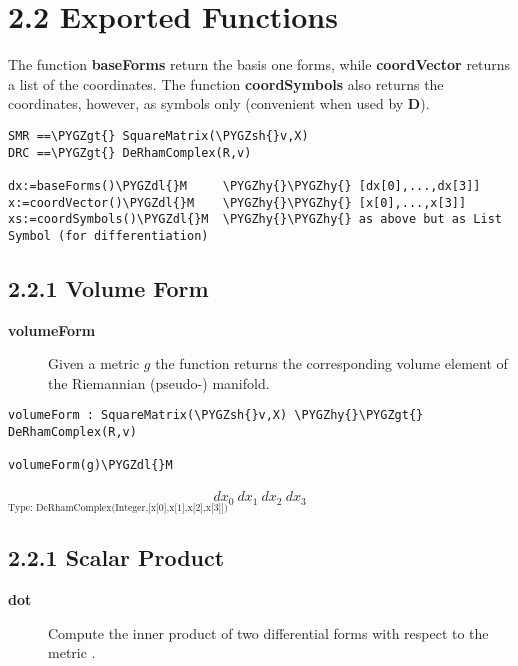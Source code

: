 \documentclass[letterpaper,10pt,english]{sphinxmanual}
\def\PYGZgt{\char`\>}
\def\PYGZsh{\char`\#}
\def\PYGZdl{\char`\$}
\def\PYGZhy{\char`\-}
\begin{document}
\section{2.2 Exported Functions}
\label{section-2.0:exported-functions}
The function \textbf{baseForms} return the basis one forms, while \textbf{coordVector}
returns a list of the coordinates. The function \textbf{coordSymbols} also returns
the coordinates, however, as symbols only (convenient when used by \textbf{D}).

\begin{Verbatim}[commandchars=\\\{\}]
SMR ==\PYGZgt{} SquareMatrix(\PYGZsh{}v,X)
DRC ==\PYGZgt{} DeRhamComplex(R,v)

dx:=baseForms()\PYGZdl{}M     \PYGZhy{}\PYGZhy{} [dx[0],...,dx[3]]
x:=coordVector()\PYGZdl{}M    \PYGZhy{}\PYGZhy{} [x[0],...,x[3]]
xs:=coordSymbols()\PYGZdl{}M  \PYGZhy{}\PYGZhy{} as above but as List Symbol (for differentiation)
\end{Verbatim}


\subsection{2.2.1 Volume Form}
\label{section-2.0:volume-form}\begin{description}
\item[{\textbf{volumeForm}}] \leavevmode
Given a metric \(g\) the function returns the corresponding volume
element of the Riemannian (pseudo-) manifold.

\end{description}

\begin{Verbatim}[commandchars=\\\{\}]
volumeForm : SquareMatrix(\PYGZsh{}v,X) \PYGZhy{}\PYGZgt{} DeRhamComplex(R,v)

volumeForm(g)\PYGZdl{}M
\end{Verbatim}
\begin{equation*}
\begin{split}{dx _ {0}} \  {dx _ {1}} \  {dx _ {2}} \  {dx _ {3}}\end{split}
\end{equation*}
$_{\text{Type: DeRhamComplex(Integer,{[}x{[}0{]},x{[}1{]},x{[}2{]},x{[}3{]}{]})}}$


\subsection{2.2.1 Scalar Product}
\label{section-2.0:scalar-product}\begin{description}
\item[{\textbf{dot}}] \leavevmode
Compute the inner product of two differential forms with respect to the
metric .

\end{description}
\end{document}
